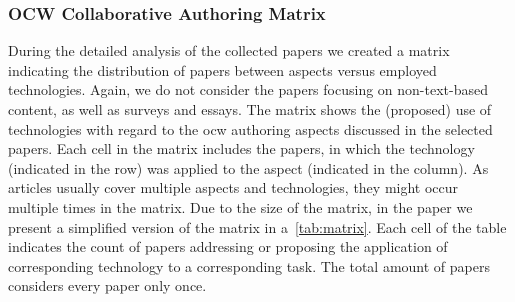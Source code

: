 \documentclass[PhD, Submit, ngerman,UKenglish,table]{scrbook}
\begin{document}
\subsubsection{OCW Collaborative Authoring Matrix}
\label{sec:matrix}

During the detailed analysis of the collected papers we created a matrix indicating the distribution of papers between aspects versus employed technologies.
Again, we do not consider the papers focusing on non-text-based content, as well as surveys and essays. 
The matrix shows the (proposed) use of technologies with regard to the \gls{ocw} authoring aspects discussed in the selected papers.
Each cell in the matrix includes the papers, in which the technology (indicated in the row) was applied to the aspect (indicated in the column).
As articles usually cover multiple aspects and technologies, they might occur multiple times in the matrix.
Due to the size of the matrix, in the paper we present a simplified version of the matrix in a~\autoref{tab:matrix}.
Each cell of the table indicates the count of papers addressing or proposing the application of corresponding technology to a corresponding task.
The total amount of papers considers every paper only once. 
\end{document}
